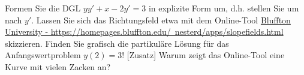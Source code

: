 \item Formen Sie die DGL $yy'+x-2y'=3$ in explizite Form um, d.h. stellen Sie um nach $y'$. Lassen Sie sich das Richtungsfeld etwa mit dem Online-Tool \href{https://homepages.bluffton.edu/~nesterd/apps/slopefields.html}{Bluffton University - https://homepages.bluffton.edu/~nesterd/apps/slopefields.html} skizzieren. Finden Sie grafisch die partikuläre Lösung für das  Anfangswertproblem $y(2)=3$! [Zusatz] Warum zeigt das Online-Tool eine Kurve mit vielen Zacken an?

